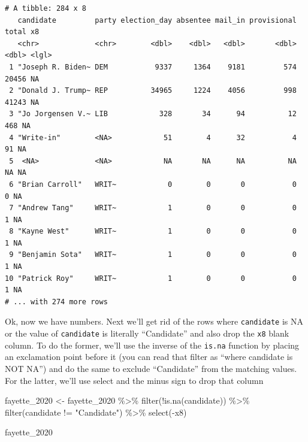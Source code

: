 \documentclass[
  letterpaper,
  DIV=11,
  numbers=noendperiod]{scrreprt}
\newenvironment{Shaded}{\begin{snugshade}}{\end{snugshade}}
\newcommand{\FunctionTok}[1]{\textcolor[rgb]{0.28,0.35,0.67}{#1}}
\newcommand{\NormalTok}[1]{\textcolor[rgb]{0.00,0.23,0.31}{#1}}
\newcommand{\OtherTok}[1]{\textcolor[rgb]{0.00,0.23,0.31}{#1}}
\newcommand{\SpecialCharTok}[1]{\textcolor[rgb]{0.37,0.37,0.37}{#1}}
\newcommand{\StringTok}[1]{\textcolor[rgb]{0.13,0.47,0.30}{#1}}
\begin{document}
\begin{verbatim}
# A tibble: 284 x 8
   candidate         party election_day absentee mail_in provisional total x8   
   <chr>             <chr>        <dbl>    <dbl>   <dbl>       <dbl> <dbl> <lgl>
 1 "Joseph R. Biden~ DEM           9337     1364    9181         574 20456 NA   
 2 "Donald J. Trump~ REP          34965     1224    4056         998 41243 NA   
 3 "Jo Jorgensen V.~ LIB            328       34      94          12   468 NA   
 4 "Write-in"        <NA>            51        4      32           4    91 NA   
 5  <NA>             <NA>            NA       NA      NA          NA    NA NA   
 6 "Brian Carroll"   WRIT~            0        0       0           0     0 NA   
 7 "Andrew Tang"     WRIT~            1        0       0           0     1 NA   
 8 "Kayne West"      WRIT~            1        0       0           0     1 NA   
 9 "Benjamin Sota"   WRIT~            1        0       0           0     1 NA   
10 "Patrick Roy"     WRIT~            1        0       0           0     1 NA   
# ... with 274 more rows
\end{verbatim}

Ok, now we have numbers. Next we'll get rid of the rows where
\texttt{candidate} is NA or the value of \texttt{candidate} is literally
``Candidate'' and also drop the \texttt{x8} blank column. To do the
former, we'll use the inverse of the \texttt{is.na} function by placing
an exclamation point before it (you can read that filter as ``where
candidate is NOT NA'') and do the same to exclude ``Candidate'' from the
matching values. For the latter, we'll use select and the minus sign to
drop that column

\begin{Shaded}
\begin{Highlighting}[]
\NormalTok{fayette\_2020 }\OtherTok{\textless{}{-}}\NormalTok{ fayette\_2020 }\SpecialCharTok{\%\textgreater{}\%} \FunctionTok{filter}\NormalTok{(}\SpecialCharTok{!}\FunctionTok{is.na}\NormalTok{(candidate)) }\SpecialCharTok{\%\textgreater{}\%} \FunctionTok{filter}\NormalTok{(candidate }\SpecialCharTok{!=} \StringTok{"Candidate"}\NormalTok{) }\SpecialCharTok{\%\textgreater{}\%} \FunctionTok{select}\NormalTok{(}\SpecialCharTok{{-}}\NormalTok{x8)}

\NormalTok{fayette\_2020}
\end{Highlighting}
\end{Shaded}
\end{document}
